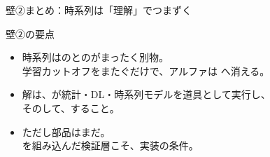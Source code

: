 \begin{frame}{壁②まとめ：時系列は「理解」でつまずく}
  \begin{keytake}{壁②の要点}
    \begin{itemize}\setlength\itemsep{2mm}
      \item 時系列はのとのがまったく別物。\\
        {\small 学習カットオフをまたぐだけで、アルファは  へ消える。}
      \item 解は、が統計・DL・時系列モデルを道具として実行し、\\
        そのして、すること。
      \item ただし部品はまだ。\\
        を組み込んだ検証層こそ、実装の条件。
    \end{itemize}
  \end{keytake}
  \vskip1mm
  \begin{center}
  \end{center}
\end{frame}

